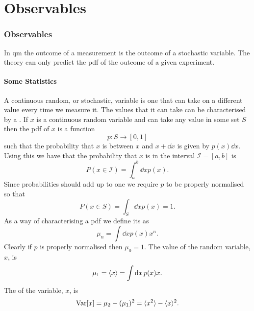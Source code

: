\part{Observables}
    \section{Observables}
    In \acrshort{qm} the outcome of a measurement is the outcome of a stochastic variable.
    The theory can only predict the \acrfull{pdf} of the outcome of a given experiment.
    \subsection{Some Statistics}
    A continuous random, or stochastic, variable is one that can take on a different value every time we measure it.
    The values that it can take can be characterised by a .
    If \(x\) is a continuous random variable and can take any value in some set \(S\) then the \acrshort{pdf} of \(x\) is a function
    \[p\colon S\to[0, 1]\]
    such that the probability that \(x\) is between \(x\) and \(x + \dd{x}\) is given by \(p(x)\dd{x}\).
    Using this we have that the probability that \(x\) is in the interval \(\mathcal{I} = [a, b]\) is
    \[P(x\in\mathcal{I}) = \int_a^b \dd{x} p(x).\]
    Since probabilities should add up to one we require \(p\) to be properly normalised so that
    \[P(x\in S) = \int_S\dd{x}p(x) = 1.\]
    As a way of characterising a \acrshort{pdf} we define its  as
    \[\mu_n = \int\dd{x}p(x)x^n.\]
    Clearly if \(p\) is properly normalised then \(\mu_0 = 1\).
    The  value of the random variable, \(x\), is
    \[\mu_1 = \langle{x}\rangle = \int\dd{x}p(x)x.\]
    The  of the variable, \(x\), is
    \[\operatorname{Var}[x] = \mu_2 - (\mu_1)^2 = \langle{x^2}\rangle - \langle{x}\rangle^2.\]
    
